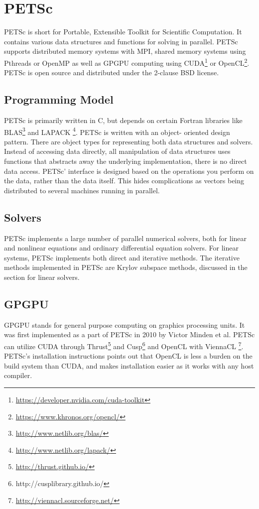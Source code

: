 \section{PETSc}

PETSc is short for Portable, Extensible Toolkit for Scientific Computation. 
It contains various data structures and functions for 
solving  in parallel. PETSc supports distributed 
memory systems with MPI, shared memory systems using Pthreads or OpenMP as well 
as GPGPU computing using CUDA\footnote{\url{https://developer.nvidia.com/cuda-toolkit}} 
or OpenCL\footnote{\url{https://www.khronos.org/opencl/}}. PETSc is open source and distributed 
under the 2-clause BSD license\cite{petsc-web-page}.

\subsection{Programming Model}

PETSc is primarily written in C, but depends on certain Fortran libraries like 
BLAS\footnote{\url{http://www.netlib.org/blas/}} and LAPACK
\footnote{\url{http://www.netlib.org/lapack/}}. PETSc is written with an object-
oriented design pattern. There are object types for representing both data structures 
and solvers. Instead of accessing data directly, all manipulation of data structures 
uses functions that abstracts away the underlying implementation, there is no direct 
data access. PETSc' interface is designed based on the operations you perform on 
the data, rather than the data itself. This hides complications as vectors being 
distributed to several machines running in parallel.

\subsection{Solvers}

PETSc implements a large number of parallel numerical solvers, both for linear and 
nonlinear equations and ordinary differential equation solvers. For linear systems, 
PETSc implements both direct and iterative methods. The iterative methods implemented 
in PETSc are Krylov subspace methods, discussed in the section for linear solvers.

\subsection{GPGPU}

GPGPU stands for general purpose computing on graphics processing units. It was 
first implemented as a part of PETSc in 2010\cite{minden2010preliminary} by Victor 
Minden et al. PETSc can utilize CUDA through Thrust\footnote{\url{http://thrust.github.io/}} 
and Cusp\footnote{http://cusplibrary.github.io/} and OpenCL with ViennaCL
\footnote{\url{http://viennacl.sourceforge.net/}}. PETSc's installation instructions 
points out that OpenCL is less a burden on the build system than CUDA, and makes 
installation easier as it works with any host compiler. 

